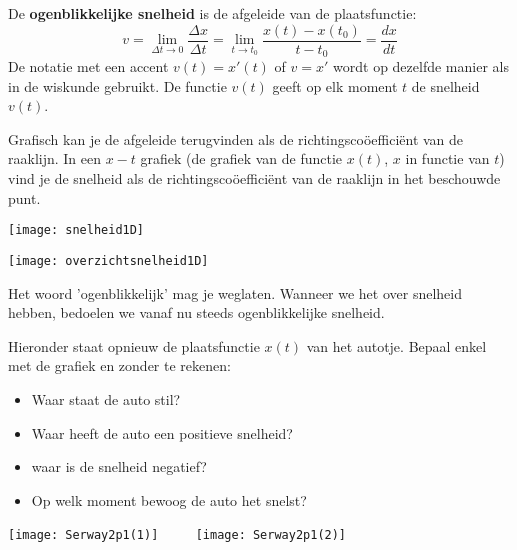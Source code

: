 \documentclass{ximera}
\begin{document}
\begin{definition}
	
De \textbf{ogenblikkelijke snelheid}  is de afgeleide van de plaatsfunctie:
\[
v=\lim_{\Delta t\to 0}\frac{\Delta x}{\Delta t}=\lim_{t\to t_0}\frac{x(t)-x(t_0)}{t-t_0}=\frac{dx}{dt}
\]
De notatie met een accent $v(t)=x'(t)$ of $v=x'$ wordt op dezelfde manier als in de wiskunde gebruikt. 
De functie $v(t)$ geeft op elk moment $t$ de snelheid $v(t)$. 
\end{definition}


Grafisch kan je de afgeleide terugvinden als de richtingscoöefficiënt van de raaklijn. In een $x-t$ grafiek (de grafiek van de functie $x(t)$, $x$ in functie van $t$) vind je  de snelheid als de richtingscoöefficiënt van de raaklijn in het beschouwde punt. 

\begin{image}
\texttt{[image: snelheid1D]}

\end{image}

\begin{image}
\texttt{[image: overzichtsnelheid1D]}

\end{image}

\begin{remark}
	Het woord 'ogenblikkelijk' mag je weglaten. Wanneer we het over snelheid hebben, bedoelen we vanaf nu steeds ogenblikkelijke snelheid.
\end{remark}

\begin{exercise}
Hieronder staat opnieuw de plaatsfunctie \(x(t)\) van het autotje. Bepaal enkel met de grafiek en zonder te rekenen: 
\begin{itemize}
	\item Waar staat de auto stil? 
	\item Waar heeft de auto een positieve snelheid?
	\item waar is de snelheid negatief? 
	\item Op welk moment bewoog de auto het snelst? 
\end{itemize}

\begin{image}
	\texttt{[image: Serway2p1(1)]}
	$\qquad$   %
	\texttt{[image: Serway2p1(2)]}
	\end{image}
	
\end{exercise}

	
\end{document}
